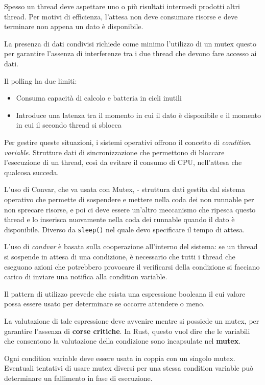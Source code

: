 Spesso un thread deve aspettare uno o più risultati intermedi prodotti altri
thread.
Per motivi di efficienza, l'attesa non deve consumare risorse e deve terminare non appena un dato è
disponibile.

La presenza di dati condivisi richiede come minimo l'utilizzo di un mutex questo per
garantire l'assenza di interferenze tra i due thread che devono fare accesso ai
dati.

Il polling ha due limiti:

\begin{itemize}
  \item Consuma capacità di calcolo e batteria in cicli inutili
  \item Introduce una latenza tra il momento in cui il dato è disponibile e il
        momento in cui il secondo thread si sblocca
\end{itemize}

Per gestire queste situazioni, i sistemi operativi offrono il concetto di \textit{condition variable}.
Strutture dati di sincronizzazione che permettono di bloccare l'esecuzione di un thread, così da evitare
il consumo di CPU, nell'attesa che qualcosa succeda.

L'uso di Convar, che va usata con Mutex, - struttura dati gestita dal sistema operativo che permette di sospendere e
mettere nella coda dei non runnable per non sprecare risorse, e poi
ci deve essere un'altro meccanismo che ripesca questo thread e lo inserisca nuovamente
nella coda dei runnable quando il dato è disponibile.
Diverso da \verb|sleep()| nel quale devo specificare il tempo di attesa.

L'uso di \textit{condvar} è basata sulla cooperazione all'interno del sistema:
se un thread si sospende in attesa di una condizione, è necessario che tutti i
thread che eseguono azioni che potrebbero provocare il verificarsi della
condizione si facciano carico di inviare una notifica alla condition variable.


Il pattern di utilizzo prevede che esista una espressione booleana il cui valore possa
essere usato per determinare se occorre attendere o meno.


La valutazione di tale espressione deve avvenire mentre si possiede un mutex, per garantire l'assenza
di \textbf{corse critiche}. In Rust, questo vuol dire che le variabili che consentono la valutazione della condizione sono
incapsulate nel \textbf{mutex}.


Ogni condition variable deve essere usata in coppia con un singolo mutex.
Eventuali tentativi di usare mutex diversi per una stessa condition variable può determinare un
fallimento in fase di esecuzione.

